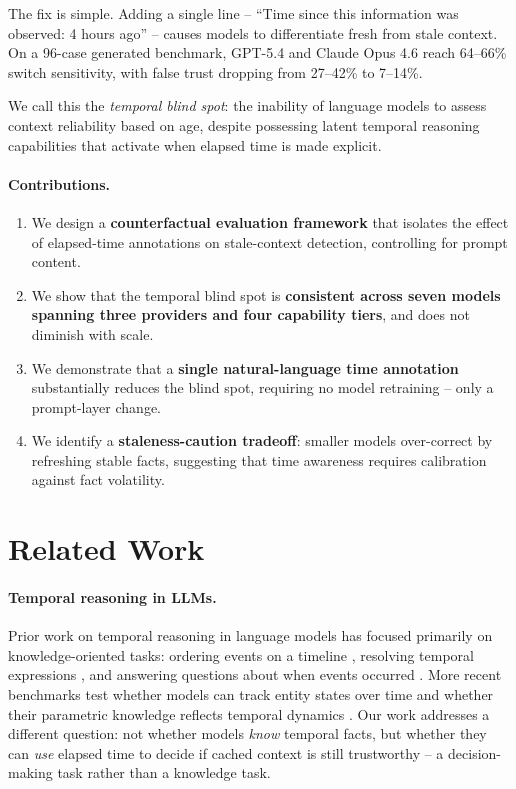 \documentclass[11pt,a4paper]{article}
\begin{document}
The fix is simple.
Adding a single line -- ``Time since this information was observed: 4 hours ago'' -- causes models to differentiate fresh from stale context.
On a 96-case generated benchmark, GPT-5.4 and Claude Opus 4.6 reach 64--66\% switch sensitivity, with false trust dropping from 27--42\% to 7--14\%.

We call this the \emph{temporal blind spot}: the inability of language models to assess context reliability based on age, despite possessing latent temporal reasoning capabilities that activate when elapsed time is made explicit.

\paragraph{Contributions.}
\begin{enumerate}
    \item We design a \textbf{counterfactual evaluation framework} that isolates the effect of elapsed-time annotations on stale-context detection, controlling for prompt content.
    \item We show that the temporal blind spot is \textbf{consistent across seven models spanning three providers and four capability tiers}, and does not diminish with scale.
    \item We demonstrate that a \textbf{single natural-language time annotation} substantially reduces the blind spot, requiring no model retraining -- only a prompt-layer change.
    \item We identify a \textbf{staleness-caution tradeoff}: smaller models over-correct by refreshing stable facts, suggesting that time awareness requires calibration against fact volatility.
\end{enumerate}

\section{Related Work}
\label{sec:related}

\paragraph{Temporal reasoning in LLMs.}
Prior work on temporal reasoning in language models has focused primarily on knowledge-oriented tasks: ordering events on a timeline \citep{ning2018multi}, resolving temporal expressions \citep{zhou2019going}, and answering questions about when events occurred \citep{dhingra2022time}.
More recent benchmarks test whether models can track entity states over time \citep{lazaridou2021mind,luu2022time} and whether their parametric knowledge reflects temporal dynamics \citep{jang2022temporalwiki,kasai2023realtime}.
Our work addresses a different question: not whether models \emph{know} temporal facts, but whether they can \emph{use} elapsed time to decide if cached context is still trustworthy -- a decision-making task rather than a knowledge task.
\end{document}
